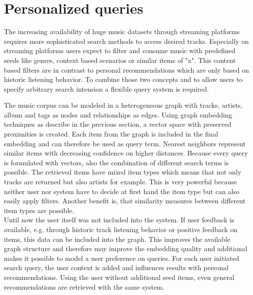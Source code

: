 \documentclass[a4paper]{llncs}
\begin{document}
	
	\section{Personalized queries}
	The increasing availability of huge music datasets through streaming platforms requires more sophisticated search methods to access desired tracks. Especially on streaming platforms users expect to filter and consume music with predefined seeds like genres, context based scenarios or similar items of "x". This content based filters are in contrast to personal recommendations which are only based on historic listening behavior. To combine those two concepts and to allow users to specify arbitrary search intension a flexible query system is required.
	
	The music corpus can be modeled in a heterogeneous graph with tracks, artists, album and tags as nodes and relationships as edges. Using graph embedding techniques as describe in the previous section, a vector space with preserved proximities is created. Each item from the graph is included in the final embedding and can therefore be used as query term. Nearest neighbors represent similar items with decreasing confidence on higher distances. Because every query is formulated with vectors, also the combination of different search terms is possible. The retrieved items have mixed item types which means that not only tracks are returned but also artists for example. This is very powerful because neither user nor system have to decide at first hand the item type but can also easily apply filters. Another benefit is, that similarity measures between different item types are possible.\\
	
	Until now the user itself was not included into the system. If user feedback is available, e.g. through historic track listening behavior or positive feedback on items, this data can be included into the graph. This improves the available graph structure and therefore may improve the embedding quality and additional makes it possible to model a user preference on queries. For each user initiated search query, the user context is added and influences results with personal recommendations. Using the user without additional seed items, even general recommendations are retrieved with the same system.
	
\end{document}
